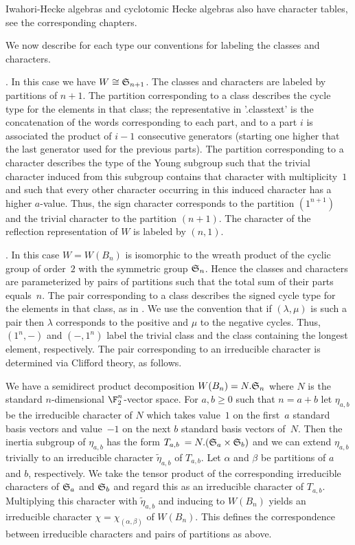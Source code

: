 Iwahori-Hecke  algebras and  cyclotomic Hecke  algebras also have character
tables, see the corresponding chapters.

We  now describe for each type our conventions for labeling the classes and
characters.

\smallskip
{}.  In this case we  have $W \cong
{\mathfrak S}_{n+1}$. The  classes and  characters are  labeled by  partitions of
$n+1$. The partition  corresponding to a class describes  the cycle type
for the  elements in that  class; the representative in  '.classtext' is
the concatenation of the words corresponding to each part, and to a part
$i$ is associated the product  of $i-1$ consecutive generators (starting
one higher  that the last  generator used  for the previous  parts). The
partition corresponding to  a character describes the type  of the Young
subgroup  such that  the trivial  character induced  from this  subgroup
contains that character with multiplicity~$1$  and such that every other
character occurring  in this induced  character has a  higher $a$-value.
Thus, the  sign character corresponds  to the partition  $(1^{n+1})$ and
the trivial  character to  the partition $(n+1)$.  The character  of the
reflection representation of $W$ is labeled by $(n,1)$.

\medskip
{}.  In this  case $W=W(B_n)$  is
isomorphic to the  wreath product of the cyclic group  of order~$2$ with
the  symmetric group  ${\mathfrak S}_n$.  Hence the  classes  and characters  are
parameterized by  pairs of partitions  such that  the total sum  of their
parts equals~$n$. The pair corresponding to a class describes the signed
cycle  type for  the  elements in  that class,  as  in \cite{Car72}.  We
use  the  convention  that  if  $(\lambda,\mu)$  is  such  a  pair  then
$\lambda$ corresponds to the positive  and $\mu$ to the negative cycles.
Thus,  $(1^n,-)$ and  $(-,1^n)$ label  the trivial  class and  the class
containing the longest element,  respectively. The pair corresponding to
an irreducible character is determined via Clifford theory, as follows.

We  have a semidirect product  decomposition $W(B_n)=N.{\mathfrak S}_n$ where $N$ is
the  standard $n$-dimensional $\F_2^n$-vector  space. For $a,b  \ge 0$ such
that  $n=a+b$ let  $\eta_{a,b}$ be  the irreducible  character of $N$ which
takes  value~$1$ on the first~$a$ standard  basis vectors and value~$-1$ on
the  next $b$ standard  basis vectors of~$N$.  Then the inertia subgroup of
$\eta_{a,b}$  has the form $T_{a,b}\:=N.({\mathfrak S}_a  \times {\mathfrak S}_b)$ and we can
extend $\eta_{a,b}$ trivially to an irreducible character
$\tilde\eta_{a,b}$  of $T_{a,b}$. Let $\alpha$ and $\beta$ be partitions of
$a$  and $b$, respectively. We take the tensor product of the corresponding
irreducible  characters  of  ${\mathfrak S}_a$  and  ${\mathfrak S}_b$  and regard this as an
irreducible   character  of  $T_{a,b}$.  Multiplying  this  character  with
$\tilde\eta_{a,b}$ and inducing to $W(B_n)$ yields an irreducible character
$\chi=  \chi_{(\alpha,\beta)}$ of $W(B_n)$. This defines the correspondence
between irreducible characters and pairs of partitions as above.


